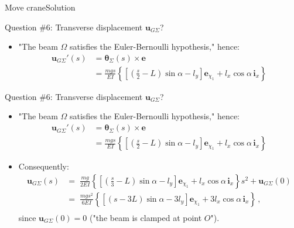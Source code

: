 \documentclass{beamer}
\newcommand{\uj}{u}
\newcommand{\xj}{x}
\newcommand{\yj}{y}
\newcommand{\uv}{{\boldsymbol\uj}}
\newcommand{\ej}{e}
\renewcommand{\ij}{i}
\newcommand{\ev}{{\boldsymbol\ej}}
\newcommand{\iv}{{\boldsymbol\ij}}
\newcommand{\medium}{\Omega}
\newcommand*{\xiu}{\chi_1}
\newcommand*{\drotj}{\theta}
\newcommand*{\drot}{{\boldsymbol\drotj}}
\begin{document}
\begin{frame}{Move crane}{Solution}
\begin{overprint}
\vskip-20pt
\begin{exampleblock}{Question \#6: Transverse displacement $\uv_{G\Sigma}$?}
\begin{itemize}
\item "The beam $\medium$ satisfies the Euler-Bernoulli hypothesis," hence:
\begin{displaymath}
\begin{split}
\uv_{G\Sigma}'(s) &=\drot_\Sigma(s)\times\ev \\
&=\frac{mgs}{EI}\left\{\left[\left(\frac{s}{2}-L\right)\sin\alpha-l_\yj\right]\ev_{\xiu}+l_\xj\cos\alpha\,\iv_\xj\right\}
\end{split}
\end{displaymath}
\end{itemize}
\end{exampleblock}

\vskip-20pt
\begin{exampleblock}{Question \#6: Transverse displacement $\uv_{G\Sigma}$?}
\begin{itemize}
\item "The beam $\medium$ satisfies the Euler-Bernoulli hypothesis," hence:
\begin{displaymath}
\begin{split}
\uv_{G\Sigma}'(s) &=\drot_\Sigma(s)\times\ev \\
&=\frac{mgs}{EI}\left\{\left[\left(\frac{s}{2}-L\right)\sin\alpha-l_\yj\right]\ev_{\xiu}+l_\xj\cos\alpha\,\iv_\xj\right\}
\end{split}
\end{displaymath}
\item Consequently:
\begin{displaymath}
\begin{split}
\uv_{G\Sigma}(s) &= \;\scriptstyle \frac{mg}{2EI}\left\{\left[\left(\frac{s}{3}-L\right)\sin\alpha-l_\yj\right]\ev_{\xiu}+l_\xj\cos\alpha\,\iv_\xj\right\}s^2+\uv_{G\Sigma}(0) \\
&= \;\scriptstyle \frac{mgs^2}{6EI}\left\{\left[\left(s-3L\right)\sin\alpha-3l_\yj\right]\ev_{\xiu}+3l_\xj\cos\alpha\,\iv_\xj\right\}\,, \\
\end{split}
\end{displaymath}
since $\uv_{G\Sigma}(0)=0$ ("the beam is clamped at point $O$").
\end{itemize}
\end{exampleblock}

\end{overprint}

\end{frame}
\end{document}
